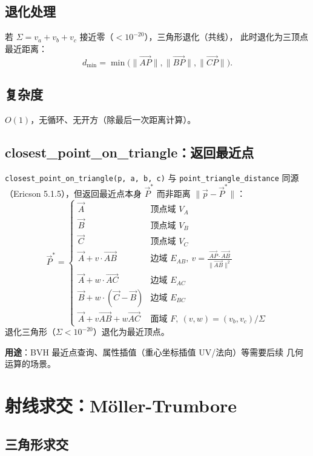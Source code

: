 \documentclass[11pt,a4paper]{article}
\begin{document}
\subsection{退化处理}

若 $\Sigma = v_a + v_b + v_c$ 接近零（$< 10^{-20}$），三角形退化（共线），
此时退化为三顶点最近距离：
\[
  d_{\min} = \min\bigl(\|\vec{AP}\|, \|\vec{BP}\|, \|\vec{CP}\|\bigr).
\]

\subsection{复杂度}

$O(1)$，无循环、无开方（除最后一次距离计算）。

\subsection{closest\_point\_on\_triangle：返回最近点}

\texttt{closest\_point\_on\_triangle(p, a, b, c)} 与 \texttt{point\_triangle\_distance}
同源（Ericson 5.1.5），但返回最近点本身 $\vec{P}^*$ 而非距离 $\|\vec{p} - \vec{P}^*\|$：
\[
  \vec{P}^* =
  \begin{cases}
    \vec{A} & \text{顶点域 } V_A \\
    \vec{B} & \text{顶点域 } V_B \\
    \vec{C} & \text{顶点域 } V_C \\
    \vec{A} + v \cdot \vec{AB} & \text{边域 } E_{AB},\ v = \frac{\vec{AP}\cdot\vec{AB}}{\|\vec{AB}\|^2} \\
    \vec{A} + w \cdot \vec{AC} & \text{边域 } E_{AC} \\
    \vec{B} + w \cdot (\vec{C}-\vec{B}) & \text{边域 } E_{BC} \\
    \vec{A} + v \vec{AB} + w \vec{AC} & \text{面域 } F,\ (v, w) = (v_b, v_c)/\Sigma
  \end{cases}
\]
退化三角形（$\Sigma < 10^{-20}$）退化为最近顶点。

\textbf{用途}：BVH 最近点查询、属性插值（重心坐标插值 UV/法向）等需要后续
几何运算的场景。

\section{射线求交：Möller-Trumbore}

\subsection{三角形求交}
\end{document}

